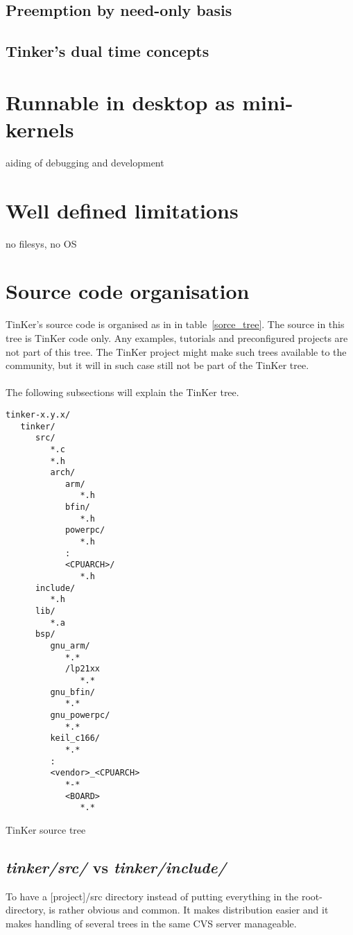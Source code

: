 \section{Preemption by need-only basis}
\section{Tinker's dual time concepts}

\chapter{Runnable in desktop as mini-kernels}
aiding of debugging and development

\chapter{Well defined limitations}
no filesys, no OS

\chapter{Source code organisation}
TinKer's source code is organised as in in table~\ref{sorce_tree}. The source in this tree is TinKer code only. Any examples, tutorials and preconfigured projects are not part of this tree. The TinKer project might make such trees available to the community, but it will in such case still not be part of the TinKer tree.
\\\\
The following subsections will explain the TinKer tree.
\begin{table}[!hbp]

\begin{verbatim}
tinker-x.y.x/
   tinker/
      src/
         *.c
         *.h
         arch/
            arm/
               *.h
            bfin/
               *.h
            powerpc/
               *.h
            :
            <CPUARCH>/
               *.h
      include/
         *.h
      lib/
         *.a
      bsp/
         gnu_arm/
            *.*
            /lp21xx
               *.*
         gnu_bfin/
            *.*
         gnu_powerpc/
            *.*
         keil_c166/
            *.*
         :
         <vendor>_<CPUARCH>
            *-*
            <BOARD>
               *.*

\end{verbatim}
\caption{TinKer source tree}\label{sorce_tree}
\end{table}
\section{\textit{tinker/src/} vs \textit{tinker/include/}}
To have a [project]/src directory instead of putting everything in the root-directory, is rather obvious and common. It makes distribution easier and it makes handling of several trees in the same CVS server manageable.

